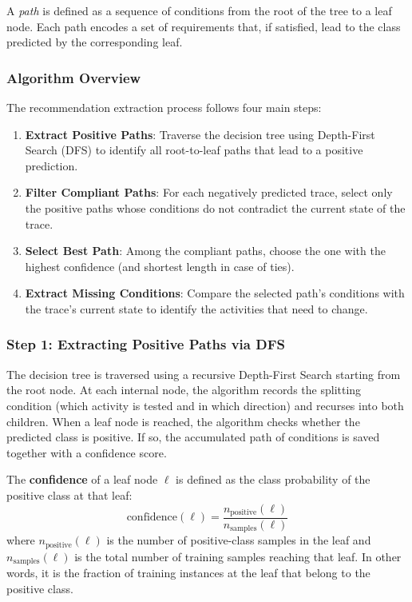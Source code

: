 \documentclass{article}
\begin{document}
\noindent
A \textit{path} is defined as a sequence of conditions from the root of the tree to a leaf node. Each path encodes a set of requirements that, if satisfied, lead to the class predicted by the corresponding leaf.

\subsubsection{Algorithm Overview}

The recommendation extraction process follows four main steps:

\begin{enumerate}
    \item \textbf{Extract Positive Paths}: Traverse the decision tree using Depth-First Search (DFS) to identify all root-to-leaf paths that lead to a positive prediction.
    \item \textbf{Filter Compliant Paths}: For each negatively predicted trace, select only the positive paths whose conditions do not contradict the current state of the trace.
    \item \textbf{Select Best Path}: Among the compliant paths, choose the one with the highest confidence (and shortest length in case of ties).
    \item \textbf{Extract Missing Conditions}: Compare the selected path's conditions with the trace's current state to identify the activities that need to change.
\end{enumerate}

\subsubsection{Step 1: Extracting Positive Paths via DFS}

The decision tree is traversed using a recursive Depth-First Search starting from the root node. At each internal node, the algorithm records the splitting condition (which activity is tested and in which direction) and recurses into both children. When a leaf node is reached, the algorithm checks whether the predicted class is positive. If so, the accumulated path of conditions is saved together with a confidence score.

\medskip
\noindent
The \textbf{confidence} of a leaf node $\ell$ is defined as the class probability of the positive class at that leaf:
\[
\text{confidence}(\ell) = \frac{n_{\text{positive}}(\ell)}{n_{\text{samples}}(\ell)}
\]
where $n_{\text{positive}}(\ell)$ is the number of positive-class samples in the leaf and $n_{\text{samples}}(\ell)$ is the total number of training samples reaching that leaf. In other words, it is the fraction of training instances at the leaf that belong to the positive class.
\end{document}
